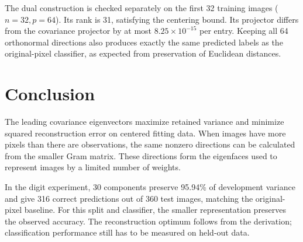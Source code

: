 \documentclass[11pt,a4paper,english]{article}
\numberwithin{equation}{section}
\begin{document}
The dual construction is checked separately on the first 32 training images ($n=32,p=64$). Its rank is 31, satisfying the centering bound. Its projector differs from the covariance projector by at most $8.25\times10^{-15}$ per entry. Keeping all 64 orthonormal directions also produces exactly the same predicted labels as the original-pixel classifier, as expected from preservation of Euclidean distances.
\FloatBarrier

\section{Conclusion}
The leading covariance eigenvectors maximize retained variance and minimize squared reconstruction error on centered fitting data. When images have more pixels than there are observations, the same nonzero directions can be calculated from the smaller Gram matrix. These directions form the eigenfaces used to represent images by a limited number of weights.

In the digit experiment, 30 components preserve 95.94\% of development variance and give 316 correct predictions out of 360 test images, matching the original-pixel baseline. For this split and classifier, the smaller representation preserves the observed accuracy. The reconstruction optimum follows from the derivation; classification performance still has to be measured on held-out data.
\end{document}
